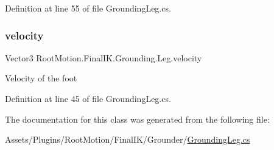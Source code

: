 Definition at line 55 of file Grounding\+Leg.\+cs.

\mbox{\label{class_root_motion_1_1_final_i_k_1_1_grounding_1_1_leg_a472a262c239b7873c2b4b150d9777700}} 
\subsubsection{\texorpdfstring{velocity}{velocity}}
{\footnotesize\ttfamily Vector3 Root\+Motion.\+Final\+I\+K.\+Grounding.\+Leg.\+velocity\hspace{0.3cm}{\ttfamily [get]}}



Velocity of the foot 



Definition at line 45 of file Grounding\+Leg.\+cs.



The documentation for this class was generated from the following file\+:\begin{DoxyCompactItemize}
\item 
Assets/\+Plugins/\+Root\+Motion/\+Final\+I\+K/\+Grounder/\mbox{\hyperlink{_grounding_leg_8cs}{Grounding\+Leg.\+cs}}\end{DoxyCompactItemize}
